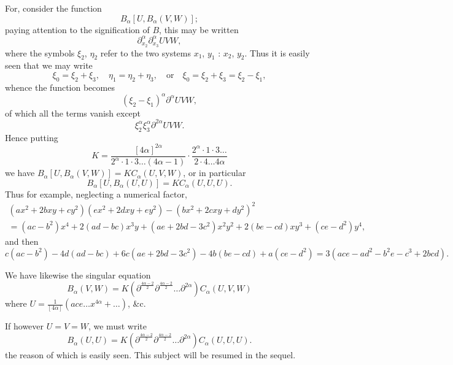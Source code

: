 \documentclass[11pt,a4paper]{article}
\theoremstyle{plain}
\theoremstyle{definition}
\theoremstyle{remark}
\begin{document}
For, consider the function
\[
B_{\alpha}[U, B_{\alpha}(V, W)];
\]
paying attention to the signification of $B$, this may be written
\[
\partial_{x_2}^{\alpha} \partial_{x_3}^{\alpha} UVW,
\]
where the symbols $\xi_2$, $\eta_2$ refer to the two systems $x_1$, $y_1$ : $x_2$, $y_2$. Thus it is easily seen
that we may write
\[
\xi_0 = \xi_2 + \xi_3, \quad \eta_1 = \eta_2 + \eta_3, \quad \text{or} \quad \xi_0 = \xi_2 + \xi_3 = \xi_2 - \xi_1,
\]
whence the function becomes
\[
(\xi_2 - \xi_1)^{\alpha} \partial^{\alpha} UVW,
\]
of which all the terms vanish except
\[
\xi_2^{\alpha} \xi_3^{\alpha} \partial^{2\alpha} UVW.
\]
Hence putting
\[
K = \frac{[4\alpha]^{2\alpha}}{2^{\alpha} \cdot 1 \cdot 3 \ldots (4\alpha - 1)} \cdot
\frac{2^{\alpha} \cdot 1 \cdot 3 \ldots}{2 \cdot 4 \ldots 4\alpha}
\]
we have $B_{\alpha}[U, B_{\alpha}(V, W)] = K C_{\alpha}(U, V, W)$,
or in particular
\[
B_{\alpha}[U, B_{\alpha}(U, U)] = K C_{\alpha}(U, U, U).
\]
Thus for example, neglecting a numerical factor,
\begin{align*}
(ax^2 + 2bxy + cy^2)(ex^2 + 2dxy + ey^2) - (bx^2 + 2cxy + dy^2)^2 \\
= (ac - b^2)x^4 + 2(ad - bc)x^3y + (ae + 2bd - 3c^2)x^2y^2 + 2(be - cd)xy^3 + (ce - d^2)y^4,
\end{align*}
and then
\[
c(ac - b^2) - 4d(ad - bc) + 6c(ae + 2bd - 3c^2) - 4b(be - cd) + a(ce - d^2)
= 3(ace - ad^2 - b^2e - c^3 + 2bcd).
\]

We have likewise the singular equation
\[
B_{\alpha}(V, W) = K(\partial^{\frac{4\alpha - 2}{2}} \partial^{\frac{4\alpha - 2}{2}} \ldots \partial^{2\alpha}) C_{\alpha}(U, V, W)
\]
where $U = \frac{1}{[4\alpha]} (ace \ldots x^{4\alpha} + \ldots)$, \&c.

If however $U = V = W$, we must write
\[
B_{\alpha}(U, U) = K(\partial^{\frac{4\alpha - 2}{2}} \partial^{\frac{4\alpha - 2}{2}} \ldots \partial^{2\alpha}) C_{\alpha}(U, U, U).
\]
the reason of which is easily seen. This subject will be resumed in the sequel.
\end{document}
